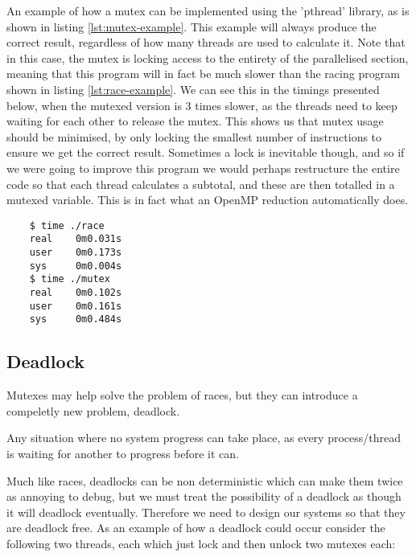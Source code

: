 An example of how a mutex can be implemented using the 'pthread' library, as is shown in listing \ref{lst:mutex-example}. This example will always produce the correct result, regardless of how many threads are used to calculate it. Note that in this case, the mutex is locking access to the entirety of the parallelised section, meaning that this program will in fact be much slower than the racing program shown in listing \ref{lst:race-example}. We can see this in the timings presented below, when the mutexed version is 3 times slower, as the threads need to keep waiting for each other to release the mutex. This shows us that mutex usage should be minimised, by only locking the smallest number of instructions to ensure we get the correct result. Sometimes a lock is inevitable though, and so if we were going to improve this program we would perhaps restructure the entire code so that each thread calculates a subtotal, and these are then totalled in a mutexed variable. This is in fact what an OpenMP reduction automatically does.

\begin{minipage}{1.0\linewidth}
  \begin{verbatim}
    $ time ./race
    real    0m0.031s
    user    0m0.173s
    sys     0m0.004s
    $ time ./mutex
    real    0m0.102s
    user    0m0.161s
    sys     0m0.484s
  \end{verbatim}
\end{minipage}

\subsection{Deadlock}

Mutexes may help solve the problem of races, but they can introduce a compeletly new problem, deadlock. 

\begin{definition}[Deadlock]
  Any situation where no system progress can take place, as every process/thread is waiting for another to progress before it can.
\end{definition}

Much like races, deadlocks can be non deterministic which can make them twice as annoying to debug, but we must treat the possibility of a deadlock as though it will deadlock eventually. Therefore we need to design our systems so that they are deadlock free. As an example of how a deadlock could occur consider the following two threads, each which just lock and then unlock two mutexes each:


